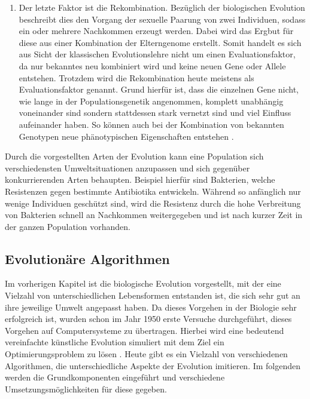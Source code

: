 \begin{enumerate}
	\item Der letzte Faktor ist die Rekombination. Bezüglich der biologischen Evolution beschreibt dies den Vorgang der sexuelle Paarung von zwei Individuen, sodass ein oder mehrere Nachkommen erzeugt werden. Dabei wird das Ergbut für diese aus einer Kombination der Elterngenome erstellt. Somit handelt es sich aus Sicht der klassischen Evolutionslehre nicht um einen Evaluationsfaktor, da nur bekanntes neu kombiniert wird und keine neuen Gene oder Allele entstehen. Trotzdem wird die Rekombination heute meistens als Evaluationsfaktor genannt. Grund hierfür ist, dass die einzelnen Gene nicht, wie lange in der Populationsgenetik angenommen, komplett unabhängig voneinander sind sondern stattdessen stark vernetzt sind und viel Einfluss aufeinander haben. So können auch bei der Kombination von bekannten Genotypen neue phänotypischen Eigenschaften entstehen \cite{weicker2015evolutionare}.
\end{enumerate}

Durch die vorgestellten Arten der Evolution kann eine Population sich verschiedensten Umweltsituationen anzupassen und sich gegenüber konkurrierenden Arten behaupten. Beispiel hierfür sind Bakterien, welche Resistenzen gegen bestimmte Antibiotika entwickeln. Während so anfänglich nur wenige Individuen geschützt sind, wird die Resistenz durch die hohe Verbreitung von Bakterien schnell an Nachkommen weitergegeben und ist nach kurzer Zeit in der ganzen Population vorhanden.
 
\subsection{Evolutionäre Algorithmen}
\label{subsec:evolutionary_algorithm}
Im vorherigen Kapitel ist die biologische Evolution vorgestellt, mit der eine Vielzahl von unterschiedlichen Lebensformen entstanden ist, die sich sehr gut an ihre jeweilige Umwelt angepasst haben. Da dieses Vorgehen in der Biologie sehr erfolgreich ist, wurden schon im Jahr 1950 erste Versuche durchgeführt, dieses Vorgehen auf Computersysteme zu übertragen. Hierbei wird eine bedeutend vereinfachte künstliche Evolution simuliert mit dem Ziel ein Optimierungsproblem zu lösen \cite{weicker2015evolutionare}. Heute gibt es ein Vielzahl von verschiedenen Algorithmen, die unterschiedliche Aspekte der Evolution imitieren. Im folgenden werden die Grundkomponenten eingeführt und verschiedene Umsetzungsmöglichkeiten für diese gegeben.

